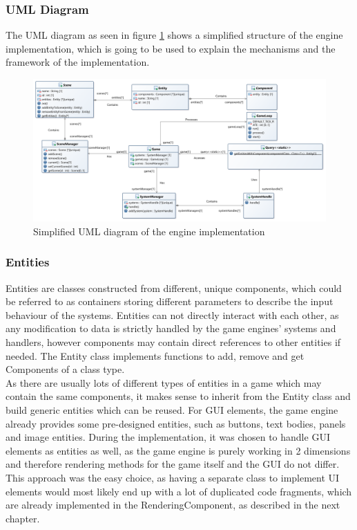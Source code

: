 \subsubsection{UML Diagram}\label{subsubsec:uml-diagram}
The \gls{UML} diagram as seen in figure \ref{fig:ecs-block-diagram} shows a simplified structure of the engine implementation, which is going to be used to explain the mechanisms
and the framework of the implementation.
\begin{figure}
    \centering
    \includegraphics[width=1.0\textwidth]{./Pictures/res/implementation/ecs-uml}
    \caption{Simplified UML diagram of the engine implementation}
    \label{fig:ecs-block-diagram}
\end{figure}

\subsubsection{Entities}\label{subsubsec:entities}
Entities are classes constructed from different, unique components, which could be referred to as containers storing different parameters to
describe the input behaviour of the systems.
Entities can not directly interact with each other, as any modification to data is strictly handled by the game engines' systems and handlers,
however components may contain direct references to other entities if needed.
The Entity class implements functions to add, remove and get Components of a class type.
\\
As there are usually lots of different types of entities in a game which may contain the same components, it makes sense to inherit from the Entity class and
build generic entities which can be reused.
For \gls{GUI} elements, the game engine already provides some pre-designed entities, such as buttons, text bodies, panels and image entities.
During the implementation, it was chosen to handle \gls{GUI} elements as entities as well, as the game engine is purely working in 2 dimensions and therefore
rendering methods for the game itself and the \gls{GUI} do not differ.
This approach was the easy choice, as having a separate class to implement UI elements would most likely end up with a lot of duplicated
code fragments, which are already implemented in the RenderingComponent, as described in the next chapter.
